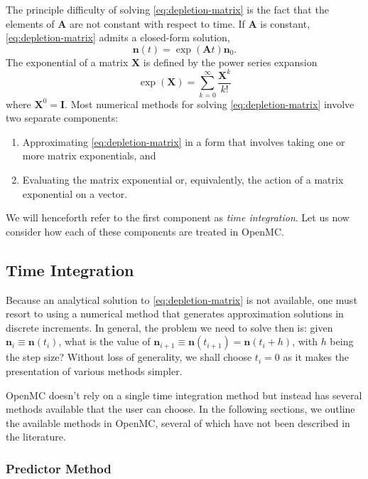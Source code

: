 \documentclass[3p,authoryear]{elsarticle}
\newcommand{\vect}[1]{\mathbf{#1}} %
\begin{document}
The principle difficulty of solving \cref{eq:depletion-matrix} is the fact that
the elements of $\vect{A}$ are not constant with respect to time. If
$\vect{A}$ is constant, \cref{eq:depletion-matrix} admits a closed-form
solution,
\begin{equation}
  \label{eq:constant-A}
  \vect{n}(t) = \exp \left (\vect{A} t \right ) \vect{n}_0.
\end{equation}
The exponential of a matrix $\vect{X}$ is defined by the power series
expansion
\begin{equation}
    \exp(\vect{X}) = \sum\limits_{k=0}^\infty \frac{\vect{X}^k}{k!}
\end{equation}
where $\vect{X}^0 = \vect{I}$. Most numerical methods for solving
\cref{eq:depletion-matrix} involve two separate components:
\begin{enumerate}
  \item Approximating \cref{eq:depletion-matrix} in a form that involves taking
  one or more matrix exponentials, and
  \item Evaluating the matrix exponential or, equivalently, the action of a
  matrix exponential on a vector.
\end{enumerate}
We will henceforth refer to the first component as \emph{time integration}. Let
us now consider how each of these components are treated in OpenMC.

\subsection{Time Integration}
\label{sec:time_integration}

Because an analytical solution to \cref{eq:depletion-matrix} is not available,
one must resort to using a numerical method that generates approximation
solutions in discrete increments. In general, the problem we need to solve then
is: given $\vect{n}_i \equiv \vect{n}(t_i)$, what is the value of
$\vect{n}_{i+1} \equiv \vect{n}(t_{i+1}) = \vect{n}(t_i + h)$, with $h$
being the step size? Without loss of generality, we shall choose $t_i=0$ as it
makes the presentation of various methods simpler.

OpenMC doesn't rely on a single time integration method but instead has several
methods available that the user can choose. In the following sections, we
outline the available methods in OpenMC, several of which have not been
described in the literature.

\subsubsection{Predictor Method}
\end{document}
